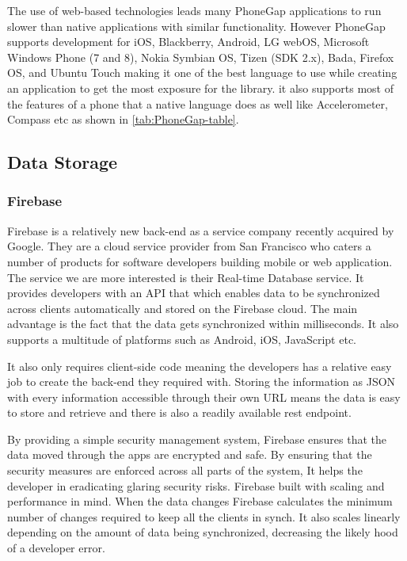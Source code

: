 The use of web-based technologies leads many PhoneGap applications
to run slower than native applications with similar functionality.
However PhoneGap supports development for iOS, Blackberry, Android,
LG webOS, Microsoft Windows Phone (7 and 8), Nokia Symbian OS, Tizen
(SDK 2.x), Bada, Firefox OS, and Ubuntu Touch making it one of the
best language to use while creating an application to get the most
exposure for the library. it also supports most of the features of
a phone that a native language does as well like Accelerometer, Compass
etc as shown in \ref{tab:PhoneGap-table}.


\subsection{Data Storage}


\subsubsection{Firebase}

Firebase\cite{firebase} is a relatively new back-end as a service
company recently acquired by Google. They are a cloud service provider
from San Francisco who caters a number of products for software developers
building mobile or web application. The service we are more interested
is their Real-time Database service. It provides developers with an
API that which enables data to be synchronized across clients automatically
and stored on the Firebase cloud. The main advantage is the fact that
the data gets synchronized within milliseconds. It also supports a
multitude of platforms such as Android, iOS, JavaScript etc.

It also only requires client-side code meaning the developers has
a relative easy job to create the back-end they required with. Storing
the information as JSON with every information accessible through
their own URL means the data is easy to store and retrieve and there
is also a readily available rest endpoint. 

By providing a simple security management system, Firebase ensures
that the data moved through the apps are encrypted and safe. By ensuring
that the security measures are enforced across all parts of the system,
It helps the developer in eradicating glaring security risks. Firebase
built with scaling and performance in mind. When the data changes
Firebase calculates the minimum number of changes required to keep
all the clients in synch. It also scales linearly depending on the
amount of data being synchronized, decreasing the likely hood of a
developer error. 

